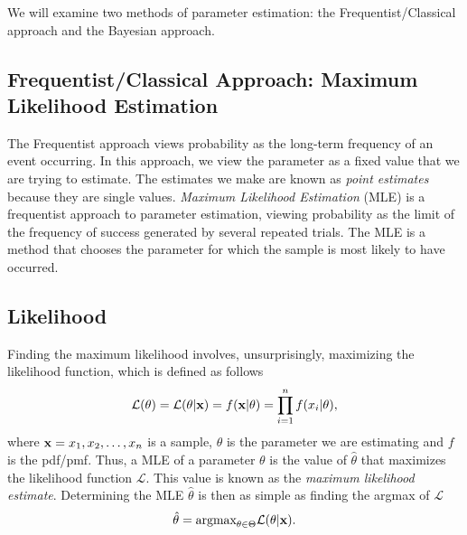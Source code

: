 We will examine two methods of parameter estimation: the Frequentist/Classical approach and the Bayesian approach.

\subsection*{Frequentist/Classical Approach: Maximum Likelihood Estimation}
The Frequentist approach views probability as the long-term frequency of an event occurring.
In this approach, we view the parameter as a fixed value that we are trying to estimate.
The estimates we make are known as \emph{point estimates} because they are single values.
\emph{Maximum Likelihood Estimation} (MLE) is a frequentist approach to parameter estimation, viewing probability as the limit of the frequency of success generated by several repeated trials.
The MLE is a method that chooses the parameter for which the sample is most likely to have occurred.

\subsection*{Likelihood}
Finding the maximum likelihood involves, unsurprisingly, maximizing the likelihood function, which is defined as follows
\begin{align*}
  \mathcal{L}(\theta) = \mathcal{L}(\theta | \mathbf{x}) = f(\mathbf{x} | \theta)=\prod_{i=1}^{n}f(x_i| \theta),
\end{align*}
where $\mathbf{x}=x_1,x_2,\ldots,x_n$ is a sample, $\theta$ is the parameter we are estimating and $f$ is the pdf/pmf.
Thus, a MLE of a parameter $\theta$ is the value of $\hat\theta$ that maximizes the likelihood function $\mathcal{L}$.
This value is known as the \emph{maximum likelihood estimate}.
Determining the MLE $\hat{\theta}$ is then as simple as finding the argmax of $\mathcal{L}$
\begin{align*}
  \hat{\theta} =  \mbox{argmax}_{\theta \in \Theta} \mathcal{L}(\theta | \mathbf{x}).
\end{align*}

